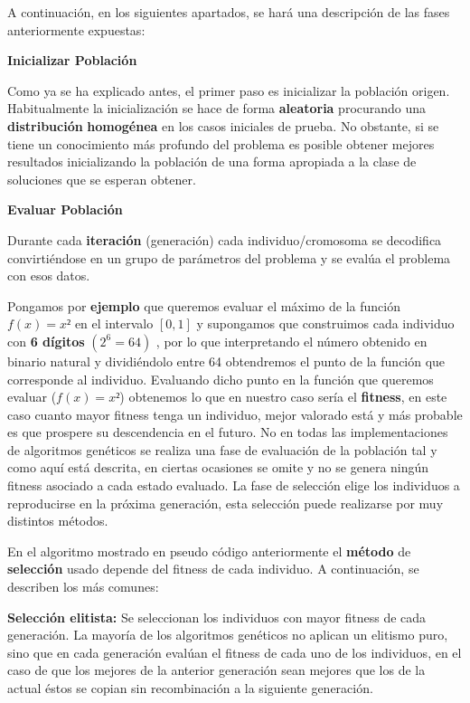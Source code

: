 \documentclass[
  a4paper,
  DIV=11,
  numbers=noendperiod]{scrreprt}
\begin{document}
A continuación, en los siguientes apartados, se hará una descripción de
las fases anteriormente expuestas:

\textbf{Inicializar Población}

Como ya se ha explicado antes, el primer paso es inicializar la
población origen. Habitualmente la inicialización se hace de forma
\textbf{aleatoria} procurando una \textbf{distribución}
\textbf{homogénea} en los casos iniciales de prueba. No obstante, si se
tiene un conocimiento más profundo del problema es posible obtener
mejores resultados inicializando la población de una forma apropiada a
la clase de soluciones que se esperan obtener.

\textbf{Evaluar Población}

Durante cada \textbf{iteración} (generación) cada individuo/cromosoma se
decodifica convirtiéndose en un grupo de parámetros del problema y se
evalúa el problema con esos datos.

Pongamos por \textbf{ejemplo} que queremos evaluar el máximo de la
función \(f(x)=x²\) en el intervalo \([0,1]\) y supongamos que
construimos cada individuo con \textbf{6 dígitos} \((2^6=64)\) , por lo
que interpretando el número obtenido en binario natural y dividiéndolo
entre 64 obtendremos el punto de la función que corresponde al
individuo. Evaluando dicho punto en la función que queremos evaluar
(\(f(x)=x²\)) obtenemos lo que en nuestro caso sería el
\textbf{fitness}, en este caso cuanto mayor fitness tenga un individuo,
mejor valorado está y más probable es que prospere su descendencia en el
futuro. No en todas las implementaciones de algoritmos genéticos se
realiza una fase de evaluación de la población tal y como aquí está
descrita, en ciertas ocasiones se omite y no se genera ningún fitness
asociado a cada estado evaluado. La fase de selección elige los
individuos a reproducirse en la próxima generación, esta selección puede
realizarse por muy distintos métodos.

En el algoritmo mostrado en pseudo código anteriormente el
\textbf{método} de \textbf{selección} usado depende del fitness de cada
individuo. A continuación, se describen los más comunes:

\textbf{Selección elitista:} Se seleccionan los individuos con mayor
fitness de cada generación. La mayoría de los algoritmos genéticos no
aplican un elitismo puro, sino que en cada generación evalúan el fitness
de cada uno de los individuos, en el caso de que los mejores de la
anterior generación sean mejores que los de la actual éstos se copian
sin recombinación a la siguiente generación.
\end{document}
